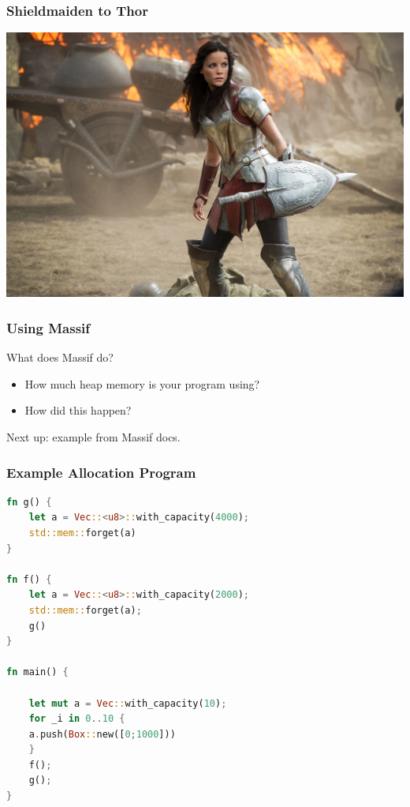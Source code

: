 \begin{frame}
\frametitle{Shieldmaiden to Thor}

\begin{center}
	\includegraphics[width=\textwidth]{images/Sif.jpg}
\end{center}

\end{frame}



\begin{frame}
\frametitle{Using Massif}

\Large

What does Massif do? 

\begin{itemize}
\item How much heap memory is your program using?
\item How did this happen?
\end{itemize}

Next up: example from Massif docs.



\end{frame}

\begin{frame}[fragile]
\frametitle{Example Allocation Program}


\begin{lstlisting}[language=Rust]
fn g() {
    let a = Vec::<u8>::with_capacity(4000);
    std::mem::forget(a)
}

fn f() {
    let a = Vec::<u8>::with_capacity(2000);
    std::mem::forget(a);
    g()
}

fn main() {

    let mut a = Vec::with_capacity(10);
    for _i in 0..10 {
	a.push(Box::new([0;1000]))
    }
    f();
    g();
}
\end{lstlisting}

\end{frame}

